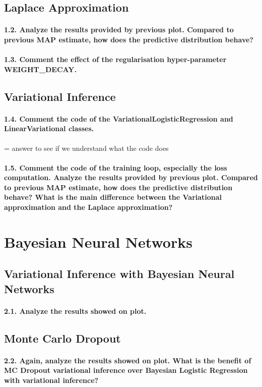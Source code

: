 \subsection{Laplace Approximation}
\paragraph{1.2. Analyze the results provided by previous plot. Compared to previous MAP estimate, how does the predictive distribution behave?}

\paragraph{1.3. Comment the effect of the regularisation hyper-parameter WEIGHT\_DECAY.}

\subsection{Variational Inference}
\paragraph{1.4. Comment the code of the VariationalLogisticRegression and LinearVariational classes.}
= answer to see if we understand what the code does

\paragraph{1.5. Comment the code of the training loop, especially the loss computation. Analyze the results provided by previous plot. Compared to previous MAP estimate, how does the predictive distribution behave? What is the main difference between the Variational approximation and the Laplace approximation?}

\section{Bayesian Neural Networks}
\subsection{Variational Inference with Bayesian Neural Networks}
\paragraph{2.1. Analyze the results showed on plot.}

\subsection{Monte Carlo Dropout}
\paragraph{2.2. Again, analyze the results showed on plot. What is the benefit of MC Dropout variational inference over Bayesian Logistic Regression with variational inference?}